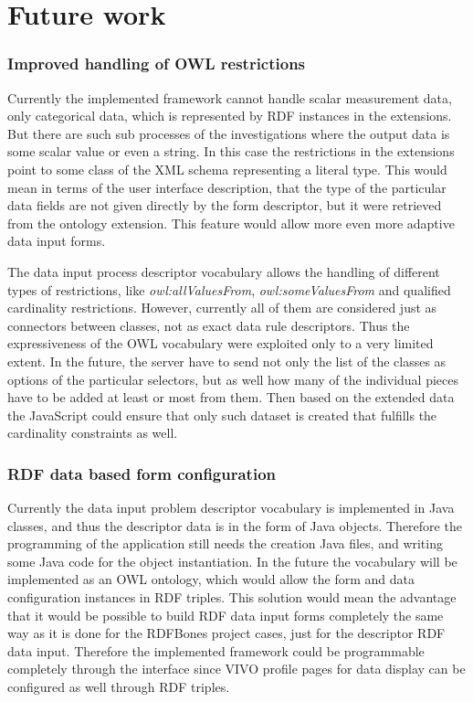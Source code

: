 \section{Future work}

\subsubsection{Improved handling of OWL restrictions}

Currently the implemented framework cannot handle scalar measurement data, only categorical data, which is represented by RDF instances in the extensions. But there are such sub processes of the investigations where the output data is some scalar value or even a string. In this case the restrictions in the extensions point to some class of the XML schema representing a literal type. This would mean in terms of the user interface description, that the type of the particular data fields are not given directly by the form descriptor, but it were retrieved from the ontology extension. This feature would allow more even more adaptive data input forms.

The data input process descriptor vocabulary allows the handling of different types of restrictions, like \textit{owl:allValuesFrom}, \textit{owl:someValuesFrom} and qualified cardinality restrictions. However, currently all of them are considered just as connectors between classes, not as exact data rule descriptors. Thus the expressiveness of the OWL vocabulary were exploited only to a very limited extent. In the future, the server have to send not only the list of the classes as options of the particular selectors, but as well how many of the individual pieces have to be added at least or most from them. Then based on the extended data the JavaScript could ensure that only such dataset is created that fulfills the cardinality constraints as well.

\subsubsection{RDF data based form configuration}

Currently the data input problem descriptor vocabulary is implemented in Java classes, and thus the descriptor data is in the form of Java objects. Therefore the programming of the application still needs the creation Java files, and writing some Java code for the object instantiation. In the future the vocabulary will be implemented as an OWL ontology, which would allow the form and data configuration instances in RDF triples. This solution would mean the advantage that it would be possible to build RDF data input forms completely the same way as it is done for the RDFBones project cases, just for the descriptor RDF data input. Therefore the implemented framework could be programmable completely through the interface since VIVO profile pages for data display can be configured as well through RDF triples.


